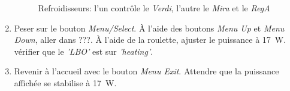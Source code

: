 \begin{enumerate}
\begin{figure}[H]
        \caption{Refroidisseurs: l'un contrôle le \textit{Verdi}, l'autre le \textit{Mira} et le \textit{RegA}}
        \label{fig:cooler}
        \end{figure}
    \item Peser sur le bouton \textit{Menu/Select}. À l'aide des boutons \textit{Menu Up} et \textit{Menu Down}, aller dans ???. À l'aide de la roulette, ajuster le puissance à 17~W. vérifier que le \textit{'LBO'} est sur \textit{'heating'}. 
    \item Revenir à l'accueil avec le bouton \textit{Menu Exit}. Attendre que la puissance affichée se stabilise à 17~W.
\end{enumerate}